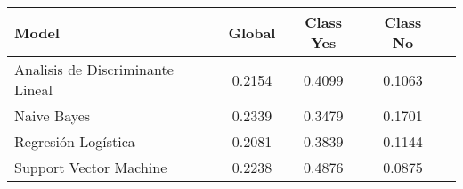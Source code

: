 \begin{tabular}{p{3cm}|c|c|c|c}
\toprule
                            Model &  Global &  Class Yes &  Class No \\
\midrule
 Analisis de Discriminante Lineal &  0.2154 &     0.4099 &    0.1063 \\
                      Naive Bayes &  0.2339 &     0.3479 &    0.1701 \\
              Regresión Logística &  0.2081 &     0.3839 &    0.1144 \\
           Support Vector Machine &  0.2238 &     0.4876 &    0.0875 \\
\bottomrule
\end{tabular}
